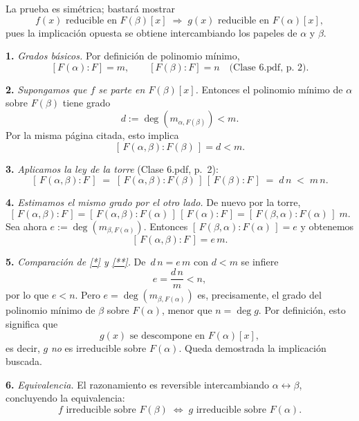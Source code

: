 \begin{solution}
    La prueba es simétrica; bastará mostrar
\[
f(x)\text{ reducible en }F(\beta)[x]
\;\Longrightarrow\;
g(x)\text{ reducible en }F(\alpha)[x],
\]
pues la implicación opuesta se obtiene intercambiando los papeles
de $\alpha$ y $\beta$.

\smallskip
\noindent
\textbf{1.} \emph{Grados básicos.}
Por definición de polinomio mínimo,
\[
[F(\alpha):F]=m,\qquad [F(\beta):F]=n
\quad
\text{(Clase 6.pdf, p.~2).}
\]

\smallskip
\noindent
\textbf{2.} \emph{Supongamos que $f$ se parte en $F(\beta)[x]$.}
Entonces el polinomio mínimo de $\alpha$ sobre
$F(\beta)$ tiene grado
\[
d:=\deg(m_{\alpha,F(\beta)})<m.
\]
Por la misma página citada, esto implica
\[
[\,F(\alpha,\beta):F(\beta)\,]=d< m.
\]

\smallskip
\noindent
\textbf{3.} \emph{Aplicamos la ley de la torre} (Clase 6.pdf, p.~2):
\[
[\,F(\alpha,\beta):F\,]
\;=\;
[\,F(\alpha,\beta):F(\beta)\,]
\,[\,F(\beta):F\,]
\;=\;
d\,n
\;<\;
m\,n.
\tag{\*}
\]

\smallskip
\noindent
\textbf{4.} \emph{Estimamos el mismo grado por el otro lado.}
De nuevo por la torre,
\[
[\,F(\alpha,\beta):F\,]
=
[\,F(\alpha,\beta):F(\alpha)\,]
\,[\,F(\alpha):F\,]
=
[\,F(\beta,\alpha):F(\alpha)\,]\;m.
\]
Sea ahora $e:=\deg(m_{\beta,F(\alpha)})$.
Entonces
\(
[\,F(\beta,\alpha):F(\alpha)\,]=e
\)
y obtenemos
\[
[\,F(\alpha,\beta):F\,]=e\,m.
\tag{\*\*}
\]

\smallskip
\noindent
\textbf{5.} \emph{Comparación de \eqref{*} y \eqref{**}.}
De \(\,d\,n=e\,m\) con \(d<m\) se infiere
\[
e
=
\frac{d\,n}{m}
<n,
\]
por lo que $e<n$.
Pero \(e=\deg(m_{\beta,F(\alpha)})\) es, precisamente,
el grado del polinomio mínimo de $\beta$ sobre $F(\alpha)$,
menor que \(n=\deg g\).
Por definición, esto significa que
\[
g(x)\text{ se descompone en }F(\alpha)[x],
\]
es decir, $g$ \emph{no} es irreducible sobre $F(\alpha)$.
Queda demostrada la implicación buscada.

\smallskip
\noindent
\textbf{6.} \emph{Equivalencia.}
El razonamiento es reversible intercambiando
$\alpha\leftrightarrow\beta$,
concluyendo la equivalencia:
\[
f\text{ irreducible sobre }F(\beta)
\;\Longleftrightarrow\;
g\text{ irreducible sobre }F(\alpha).
\]
\end{solution}